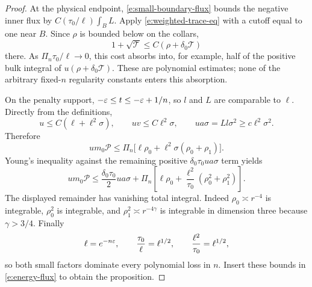 \begin{proof}
At the physical endpoint, \eqref{e:small-boundary-flux} bounds the
negative inner flux by $C(\tau_0/\ell)\int_B L$.
Apply \eqref{e:weighted-trace-eq} with a cutoff equal to one near $B$.
Since $\rho$ is bounded below on the collars,
\[
 1+\sqrt{\mathcal T}\le C(\rho+\delta_0\mathcal T)
\]
there.  As $\Pi_n\tau_0/\ell\to0$, this cost absorbs into, for
example, half of the positive bulk integral of
$u(\rho+\delta_0\mathcal T)$.  These are polynomial estimates; none
of the arbitrary fixed-$n$ regularity constants enters this
absorption.

On the penalty support, $-\varepsilon\le t\le-\varepsilon+1/n$, so
$l$ and $L$ are comparable to $\ell$.  Directly from the definitions,
\begin{equation}\label{e:penalty-sizes}
 u\le C(\ell+\ell^2\sigma),\qquad
 uv\le C\ell^2\sigma,\qquad
 ua\sigma=Ll\sigma^2\ge c\ell^2\sigma^2.
\end{equation}
Therefore
\[
 um_0\mathcal P\le
       \Pi_n\bigl[\ell\rho_0+
                        \ell^2\sigma(\rho_0+\rho_1)\bigr].
\]
Young's inequality against the remaining positive
$\delta_0\tau_0ua\sigma$ term yields
\begin{equation}\label{e:penalty-absorption}
 um_0\mathcal P\le
 \frac{\delta_0\tau_0}{2}ua\sigma+
 \Pi_n\left[\ell\rho_0+
       \frac{\ell^2}{\tau_0}(\rho_0^2+\rho_1^2)\right].
\end{equation}
The displayed remainder has vanishing total integral.
Indeed $\rho_0\asymp r^{-4}$ is integrable,
$\rho_0^2$ is integrable, and
$\rho_1^2\asymp r^{-4\gamma}$ is integrable in dimension three
because $\gamma>3/4$.  Finally
\[
 \ell=e^{-n\varepsilon},\qquad
 \frac{\tau_0}{\ell}=\ell^{1/2},\qquad
 \frac{\ell^2}{\tau_0}=\ell^{1/2},
\]
so both small factors dominate every polynomial loss in $n$.
Insert these bounds in \eqref{e:energy-flux} to obtain the proposition.
\end{proof}

